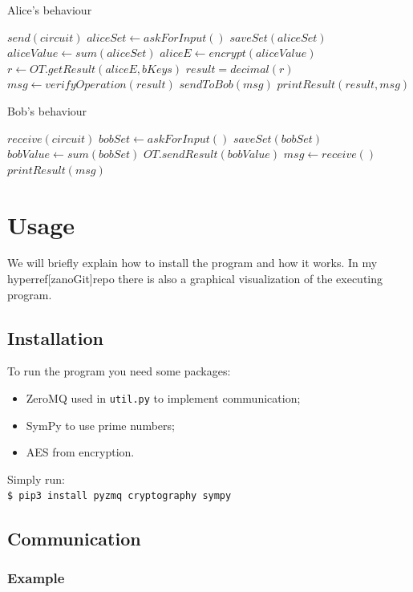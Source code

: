 \documentclass[12pt]{article}
\newcommand{\inlinecode}{\texttt}
\begin{document}
\begin{minipage}{0.46\textwidth}
    \begin{algorithm}[H]
        \centering
        \caption{Alice's behaviour}\label{alice:algo}
        \begin{algorithmic}[1]
            \State $send(circuit)$  
            \State $aliceSet \gets askForInput()$ 
            \State $saveSet(aliceSet)$ 
            \State
            \State $aliceValue \gets sum(aliceSet)$
            \State $aliceE \gets encrypt(aliceValue)$
            \State
            \State $r \gets OT.getResult(aliceE,bKeys)$
            \State
            \State $result = decimal(r)$
            \State $msg \gets verifyOperation(result)$ 
            \State $sendToBob(msg)$
            \State $printResult(result,msg)$

        \end{algorithmic}
    \end{algorithm}
    \end{minipage}
    \hfill
    \begin{minipage}{0.46\textwidth}
    \begin{algorithm}[H]
        \centering
        \caption{Bob's behaviour}\label{bob:algo}
        \begin{algorithmic}[1]
            \State $receive(circuit)$  
            \State $bobSet \gets askForInput()$ 
            \State $saveSet(bobSet)$ 
            \State
            \State $bobValue \gets sum(bobSet)$
            \State
            \State $OT.sendResult(bobValue)$
            \State
            \State $msg \gets receive()$
            \State $printResult(msg)$

        \end{algorithmic}
    \end{algorithm}
    \end{minipage}

\section{Usage}
We will briefly explain how to install the program and how it works. In my hyperref[zanoGit]{repo} there is also a graphical visualization of the executing program. 
\subsection{Installation}
To run the program you need some packages:
\begin{itemize}
    \item ZeroMQ used in \inlinecode{util.py} to implement communication;
    \item SymPy to use prime numbers;
    \item AES from encryption.
\end{itemize}
Simply run:\\
\inlinecode{\$ pip3 install pyzmq cryptography sympy}
\subsection{Communication}
\subsubsection{Example}






\end{document}
